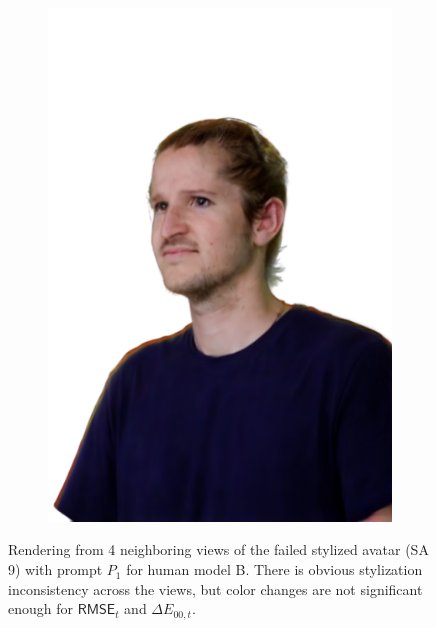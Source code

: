 \begin{figure}[ht]
\begin{subfigure}{0.2\linewidth}
		\includegraphics[width=\textwidth]{Figures/failed/rabbit/34_render-removebg-preview.png}
	\end{subfigure}
	\caption{Rendering from 4 neighboring views of the failed stylized avatar (SA 9) with prompt $P_1$ for human model B. There is obvious stylization inconsistency across the views, but color changes are not significant enough for $\mathsf{RMSE}_{t}$ and $\Delta E_{00,t}$.}
	\label{fig:failed_rabbit}
\end{figure}

